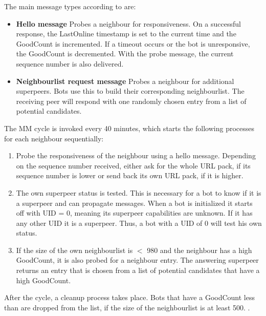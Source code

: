 \documentclass{article}
\begin{document}
The main message types according to \cite{AMP2P} are:

\begin{itemize}
	\item \textbf{Hello message}  Probes a neighbour for responsiveness. On a successful response, the LastOnline timestamp is set to the current time and the GoodCount is incremented. If a timeout occurs or the bot is unresponsive, the GoodCount is decremented. With the probe message, the current sequence number is also delivered.
	\item \textbf{Neighbourlist request message}  Probes a neighbour for additional superpeers. Bots use this to build their corresponding neighbourlist. The receiving peer will respond with one randomly chosen entry from a list of potential candidates.
\end{itemize}

The MM cycle is invoked every 40 minutes, which starts the following processes for each neighbour sequentially:

\begin{enumerate}
    \item Probe the responsiveness of the neighbour using a hello message.  Depending on the sequence number received, either ask for the whole URL pack, if its sequence number is lower or send back its own URL pack, if it is higher.
    \item The own superpeer status is tested. This is necessary for a bot to know if it is a superpeer and can propagate messages. When a bot is initialized it starts off with UID = 0, meaning its superpeer capabilities are unknown. If it has any other UID it is a superpeer. Thus, a bot with a UID of 0 will test his own status.
    \item If the size of the own neighbourlist is $<$ 980 and the neighbour has a high GoodCount, it is also probed for a neighbour entry. The answering superpeer returns an entry that  is chosen from a list of potential candidates that have a high GoodCount.
\end{enumerate}

After the cycle, a cleanup process takes place. Bots that have a GoodCount less than are dropped from the list, if the size of the neighbourlist is at least 500. \cite{AMP2P}. \\
\end{document}
